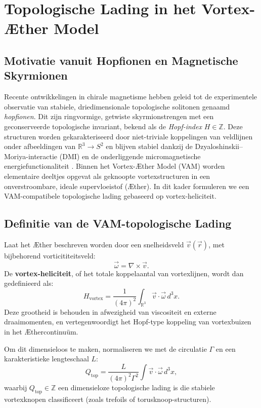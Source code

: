 \section{Topologische Lading in het Vortex-Æther Model}\label{sec:appendix_9}

\subsection{Motivatie vanuit Hopfionen en Magnetische Skyrmionen}

Recente ontwikkelingen in chirale magnetisme hebben geleid tot de experimentele observatie van stabiele, driedimensionale topologische solitonen genaamd \emph{hopfionen}. Dit zijn ringvormige, getwiste skyrmionstrengen met een geconserveerde topologische invariant, bekend als de \emph{Hopf-index} $H \in \mathbb{Z}$. Deze structuren worden gekarakteriseerd door niet-triviale koppelingen van veldlijnen onder afbeeldingen van $\mathbb{R}^3 \to S^2$ en blijven stabiel dankzij de Dzyaloshinskii–Moriya-interactie (DMI) en de onderliggende micromagnetische energiefunctionaliteit \cite{Zheng2023Hopfions}. Binnen het Vortex-Æther Model (VAM) worden elementaire deeltjes opgevat als geknoopte vortexstructuren in een onverstroombare, ideale supervloeistof (Æther). In dit kader formuleren we een VAM-compatibele topologische lading gebaseerd op vortex-heliciteit.

\subsection{Definitie van de VAM-topologische Lading}

Laat het Æther beschreven worden door een snelheidsveld $\vec{v}(\vec{r})$, met bijbehorend vorticititeitsveld:
\begin{equation}
    \vec{\omega} = \nabla \times \vec{v}.
\end{equation}
De \textbf{vortex-heliciteit}, of het totale koppelaantal van vortexlijnen, wordt dan gedefinieerd als:
\begin{equation}
    H_\text{vortex} = \frac{1}{(4\pi)^2} \int_{\mathbb{R}^3} \vec{v} \cdot \vec{\omega} \, d^3x.
    \label{eq:heliciteit}
\end{equation}
Deze grootheid is behouden in afwezigheid van viscositeit en externe draaimomenten, en vertegenwoordigt het Hopf-type koppeling van vortexbuizen in het Æthercontinuüm.

Om dit dimensieloos te maken, normaliseren we met de circulatie $\Gamma$ en een karakteristieke lengteschaal $L$:
\begin{equation}
    Q_\text{top} = \frac{L}{(4\pi)^2 \Gamma^2} \int \vec{v} \cdot \vec{\omega} \, d^3x,
    \label{eq:qtop}
\end{equation}
waarbij $Q_\text{top} \in \mathbb{Z}$ een dimensieloze topologische lading is die stabiele vortexknopen classificeert (zoals trefoils of torusknoop-structuren).

